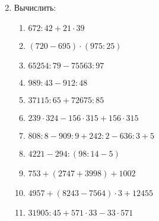 \documentclass[12pt, a4paper]{article}
\begin{document}
\begin{enumerate}
\begin{multicols}{2}
	\end{multicols}
	\item Вычислить:
	\begin{enumerate}[label=\textbf{\arabic*)}]
		\item \( 672:42+21\cdot39 \)
		\item \( (720-695)\cdot(975:25) \)
		\item \( 65254:79-75563:97 \)
		\item \( 989:43-912:48 \)
		\item \( 37115:65+72675:85 \)
		\item \( 239\cdot324 - 156\cdot315 + 156\cdot315 \)
		\item \( 808:8-909:9+242:2-636:3+5 \)
		\item \( 4221-294:(98:14-5) \)
		\item \( 753+(2747+3998)+1002 \)
		\item \( 4957+(8243-7564)\cdot3+12455 \)
		\item \( 31905:45+571\cdot33-33\cdot571 \)
	\end{enumerate}
\end{enumerate}
\end{document}
